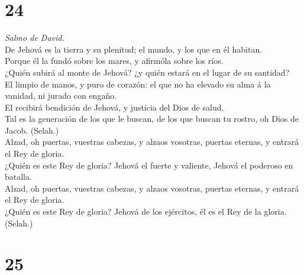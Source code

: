 \hypertarget{section-23}{%
\section{24}\label{section-23}}

 \emph{Salmo de David.}\\
De Jehová es la tierra y su plenitud; el mundo, y los que en él
habitan.\\
 Porque él la fundó sobre los mares, y afirmóla sobre los
ríos.\\
 ¿Quién subirá al monte de Jehová? ¿y quién estará en el
lugar de su santidad?\\
 El limpio de manos, y puro de corazón: el que no ha elevado
su alma á la vanidad, ni jurado con engaño.\\
 El recibirá bendición de Jehová, y justicia del Dios de
salud.\\
 Tal es la generación de los que le buscan, de los que
buscan tu rostro, oh Dios de Jacob. (Selah.)\\
 Alzad, oh puertas, vuestras cabezas, y alzaos vosotras,
puertas eternas, y entrará el Rey de gloria.\\
 ¿Quién es este Rey de gloria? Jehová el fuerte y valiente,
Jehová el poderoso en batalla.\\
 Alzad, oh puertas, vuestras cabezas, y alzaos vosotras,
puertas eternas, y entrará el Rey de gloria.\\
 ¿Quién es este Rey de gloria? Jehová de los ejércitos, él
es el Rey de la gloria. (Selah.)

\hypertarget{section-24}{%
\section{25}\label{section-24}}

